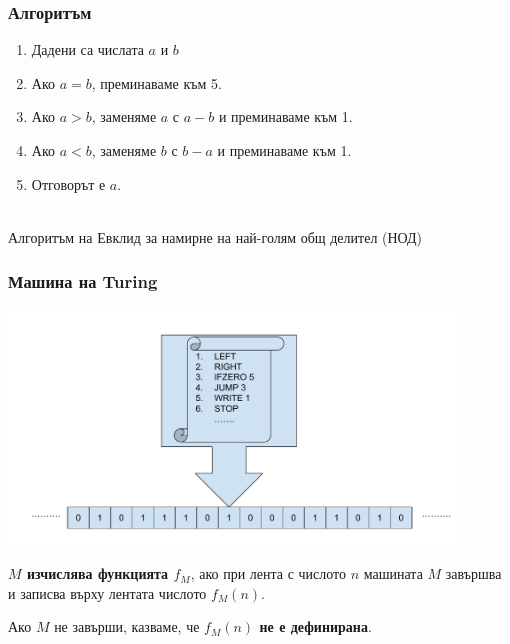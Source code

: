 \documentclass{beamer}
\begin{document}
\begin{frame}
  \frametitle{Алгоритъм}
  \begin{enumerate}
  \item Дадени са числата $a$ и $b$
  \item Ако $a = b$, преминаваме към 5.
  \item Ако $a > b$, заменяме $a$ с $a - b$ и преминаваме към 1.
  \item Ако $a < b$, заменяме $b$ с $b - a$ и преминаваме към 1.
  \item Отговорът е $a$.
  \end{enumerate}
  \pause\ \\[2em]
  Алгоритъм на Евклид за намирне на най-голям общ делител (НОД)
\end{frame}

\begin{frame}
  \frametitle{Машина на Turing}

  \includegraphics[width=0.9\textwidth]{images/turing.pdf}

  \pause
  \textbf{$M$ изчислява функцията $f_M$}, ако при лента с числото $n$ машината $M$ завършва и записва върху лентата числото $f_M(n)$.

  \pause
  Ако $M$ не завърши, казваме, че \textbf{$f_M(n)$ не е дефинирана}.
\end{frame}
\end{document}
